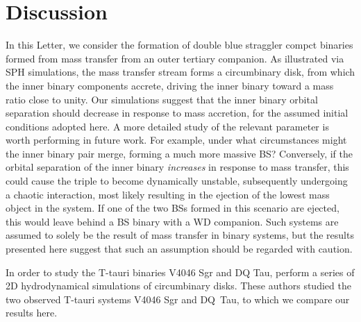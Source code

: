 \documentclass{aastex62}
\begin{document}
\section{Discussion} \label{sect:discussion}

In this Letter, we consider the formation of double blue straggler compct binaries formed 
from mass transfer from an outer tertiary companion.  As illustrated via SPH simulations, 
the mass transfer stream forms a circumbinary 
disk, from which the inner binary components accrete, driving the inner binary toward a 
mass ratio close to unity.  Our simulations suggest that the inner binary orbital separation 
should decrease in response to mass accretion, for the assumed initial conditions adopted here.  A more 
detailed study of the relevant parameter is worth performing in future work.  For example, under what circumstances 
might the inner binary pair merge, forming a much more massive BS?  Conversely, if the orbital 
separation of the inner binary \textit{increases} in response to mass transfer, this could 
cause the triple to become dynamically unstable, subsequently undergoing a chaotic interaction, most likely 
resulting in the ejection of the lowest mass object in the system.  If one of the two BSs formed in 
this scenario are ejected, this would leave behind a BS binary with a WD companion.  Such systems 
are assumed to solely be the result of mass transfer in binary systems, but the results presented here 
suggest that such an assumption should be regarded with caution.

In order to study the T-tauri binaries V4046 Sgr and DQ Tau, 
\cite{2011MNRAS.413.2679D} perform a series of 2D hydrodynamical
simulations of circumbinary disks.  These authors studied the two observed
T-tauri systems V4046 Sgr and DQ~Tau, to which we compare our results here.
\end{document}
